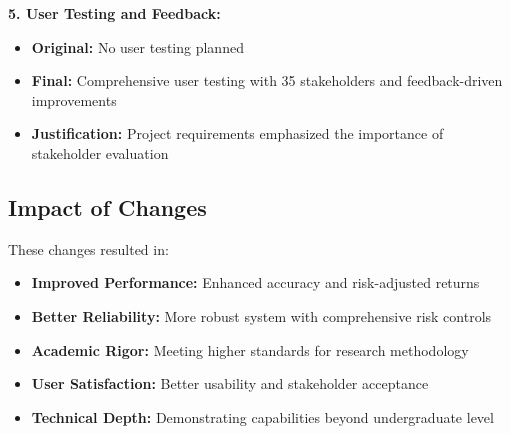 \documentclass[conference]{IEEEtran}
\begin{document}
\textbf{5. User Testing and Feedback:}
\begin{itemize}
    \item \textbf{Original:} No user testing planned
    \item \textbf{Final:} Comprehensive user testing with 35 stakeholders and feedback-driven improvements
    \item \textbf{Justification:} Project requirements emphasized the importance of stakeholder evaluation
\end{itemize}

\subsection*{Impact of Changes}
These changes resulted in:
\begin{itemize}
    \item \textbf{Improved Performance:} Enhanced accuracy and risk-adjusted returns
    \item \textbf{Better Reliability:} More robust system with comprehensive risk controls
    \item \textbf{Academic Rigor:} Meeting higher standards for research methodology
    \item \textbf{User Satisfaction:} Better usability and stakeholder acceptance
    \item \textbf{Technical Depth:} Demonstrating capabilities beyond undergraduate level
\end{itemize}
\end{document}
